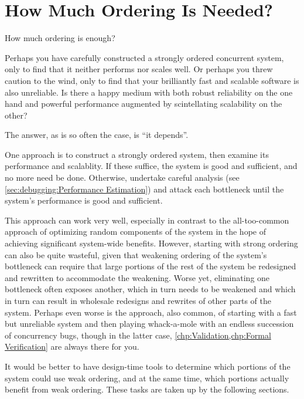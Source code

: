 
\section{How Much Ordering Is Needed?}
\label{sec:app:questions:How Much Ordering Is Needed?}

How much ordering is enough?

Perhaps you have carefully constructed a strongly ordered concurrent
system, only to find that it neither performs nor scales well.
Or perhaps you threw caution to the wind, only to find that your
brilliantly fast and scalable software is also unreliable.
Is there a happy medium with both robust reliability on the one
hand and powerful performance augmented by scintellating scalability on
the other?

The answer, as is so often the case, is ``it depends''.

One approach is to construct a strongly ordered system, then examine
its performance and scalablity.
If these suffice, the system is good and sufficient, and no more need
be done.
Otherwise, undertake careful analysis
(see \cref{sec:debugging:Performance Estimation})
and attack each bottleneck until the system's performance is good and
sufficient.

This approach can work very well, especially in contrast to the
all-too-common approach of optimizing random components of the system
in the hope of achieving significant system-wide benefits.
However, starting with strong ordering can also be quite wasteful,
given that weakening ordering of the system's bottleneck can require
that large portions of the rest of the system be redesigned and
rewritten to accommodate the weakening.
Worse yet, eliminating one bottleneck often exposes another, which
in turn needs to be weakened and which in turn can result in wholesale
redesigns and rewrites of other parts of the system.
Perhaps even worse is the approach, also common, of starting with a
fast but unreliable system and then playing whack-a-mole with an endless
succession of concurrency bugs, though in the latter case,
\cref{chp:Validation,chp:Formal Verification}
are always there for you.

It would be better to have design-time tools to determine which portions
of the system could use weak ordering, and at the same time, which
portions actually benefit from weak ordering.
These tasks are taken up by the following sections.

